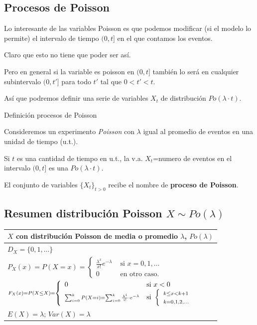 \documentclass[
  letterpaper,
  DIV=11,
  numbers=noendperiod]{scrreprt}
\begin{document}
\subsection{Procesos de Poisson}\label{procesos-de-poisson}

Lo interesante de las variables Poisson es que podemos modificar (si el
modelo lo permite) el intervalo de tiempo \((0,t]\) en el que contamos
los eventos.

Claro que esto no tiene que poder ser así.

Pero en general si la variable es poisson en \((0,t]\) también lo será
en cualquier subintervalo \((0,t']\) para todo \(t'\) tal que
\(0<t'<t\).

Así que podremos definir una serie de variables \(X_t\) de distribución
\(Po(\lambda\cdot t)\).

Definición procesos de Poisson

Consideremos un experimento \emph{Poisson} con \(\lambda\) igual al
promedio de eventos en una unidad de tiempo (u.t.).

Si \(t\) es una cantidad de tiempo en u.t., la v.a. \(X_{t}\)=numero de
eventos en el intervalo \((0,t]\) es una \(Po(\lambda\cdot t)\).

El conjunto de variables \(\{X_t\}_{t>0}\) recibe el nombre de
\textbf{proceso de Poisson}.

\subsection{\texorpdfstring{Resumen distribución Poisson
\(X\sim Po(\lambda)\)}{Resumen distribución Poisson X\textbackslash sim Po(\textbackslash lambda)}}\label{resumen-distribuciuxf3n-poisson-xsim-polambda}

\renewcommand{\arraystretch}{1.75}
\begin{table}
\centering
\begin{tabular}{|l|}
\hline\rowcolor{LightBlue}
$X$ con distribución Poisson de media o promedio $\lambda$, $Po(\lambda)$
\\\hline
$D_X=\{0,1,\ldots \}$ \\\hline
$P_X(x)=P(X=x)=\left\{\begin{array}{ll} \frac{\lambda^x}{x!}e^{-\lambda} & \mbox{ si } x=0,1,\ldots\\ 0 & \mbox{ en otro caso.}\end{array}\right.$\\\hline
$\scriptstyle F_X(x)=P(X\leq X)=\left\{\begin{array}{ll} 0 & \mbox{si } x<0\\\displaystyle\scriptstyle\sum_{i=0}^{k} P(X=i)= \displaystyle\scriptstyle\sum_{i=0}^{k} \frac{\lambda^i}{i!}\cdot e^{-\lambda} & \mbox{si }\left\{\begin{array}{l}\scriptstyle k\leq x< k+1\\\scriptstyle k=0,1,2,\ldots\end{array}\right.\end{array}\right.$
 \\\hline
$E(X)=\lambda$; $Var(X)=\lambda$\\\hline
\end{tabular}
\end{table}
\end{document}
